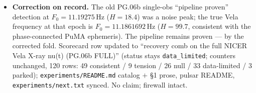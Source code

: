 \begin{itemize}[leftmargin=1.5em]
usable obs 3.4\,d / 7\,d post-glitch); next decider: $<$3-d post-glitch X-ray observations of a future Vela
glitch (eXTP class).
\item \textbf{Correction on record.} The old PG.06b single-obs ``pipeline proven'' detection at
$F_0=11.19275$\,Hz ($H=18.4$) was a noise peak; the true Vela frequency at that epoch is
$F_0=11.1861692$\,Hz ($H=99.7$, consistent with the phase-connected PuMA ephemeris). The pipeline remains
proven --- by the corrected fold. Scorecard row updated to ``recovery comb on the full NICER Vela X-ray
nu(t) (PG.06b FULL)'' (status stays \texttt{data\_limited}; counters unchanged, 120 rows: 49 consistent / 9
tension / 26 null / 33 data-limited / 3 parked); \texttt{experiments/README.md} catalog $+$ \S1 prose,
pulsar README, \texttt{experiments/next.txt} synced. No claim; firewall intact.
\end{itemize}

